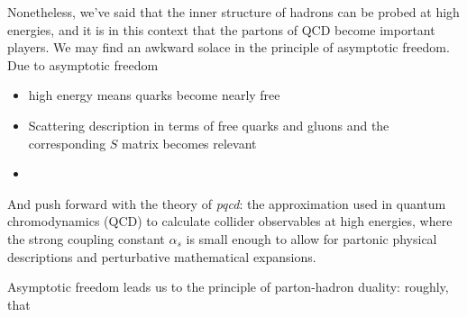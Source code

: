 Nonetheless, we've said that the inner structure of hadrons can be probed at high energies, and it is in this context that the partons of QCD become important players.
%
We may find an awkward solace in the principle of asymptotic freedom.
%
Due to asymptotic freedom
\begin{itemize}
    \item
        high energy means quarks become nearly free

    \item
        Scattering description in terms of free quarks and gluons and the corresponding \(S\) matrix becomes relevant

    \item
\end{itemize}
%
And push forward with the theory of \emph{\gls{pqcd}}:
%
the approximation used in quantum chromodynamics (QCD) to calculate collider observables at high energies, where the strong coupling constant \( \alpha_s \) is small enough to allow for partonic physical descriptions and perturbative mathematical expansions.




Asymptotic freedom leads us to the principle of parton-hadron duality:
%
roughly, that 

